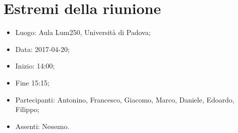\documentclass[../verbale-2017-04-20.tex]{subfiles}
\begin{document}
\section{Estremi della riunione}
	\begin{itemize}
		\item Luogo: Aula Lum250, Università di Padova;
        \item Data: 2017-04-20;
        \item Inizio: 14:00;
        \item Fine 15:15;
		\item Partecipanti: Antonino, Francesco, Giacomo, Marco, Daniele, Edoardo, Filippo;
        \item Assenti: Nessuno.
	\end{itemize}
\end{document}
